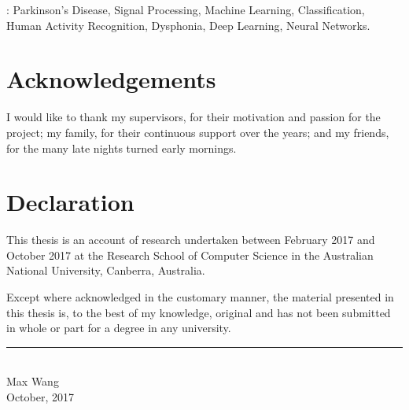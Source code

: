 \documentclass[12pt, twoside]{book}
\renewcommand\emph[1]{\textit{\color{USred}{#1}}}
\begin{document}






\emph{Keywords}: Parkinson's Disease, Signal Processing, Machine Learning, Classification, Human Activity Recognition, Dysphonia,  Deep Learning, Neural Networks.


\chapter*{Acknowledgements}
I would like to thank my supervisors, for their motivation and passion for the project; my family, for their continuous support over the years; and my friends, for the many late nights turned early mornings.


\chapter*{Declaration}
This thesis is an account of research undertaken between February 2017 and 
October 2017 at the Research School of Computer Science in 
the Australian National University, Canberra, Australia.

Except where acknowledged in the customary manner, the material 
presented in this thesis is, to the best of my knowledge, original and has not been submitted in whole or part for a degree in any 
university.

\vspace{85mm}  %
\begin{flushright}
\rule{40mm}{.15mm}\\[-5pt]   
 Max Wang\\[-5pt]
 October, 2017
\end{flushright}
\end{document}
